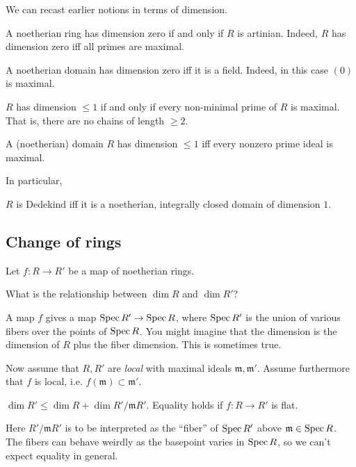 We can recast earlier notions in terms of dimension.
\begin{remark} 
A noetherian ring has dimension zero if and only if $R$ is artinian. Indeed,
$R$ has dimension zero iff all primes are maximal.
\end{remark} 


\begin{remark} 
A noetherian domain has dimension zero iff it is a field. Indeed, in this case
$(0)$ is maximal.
\end{remark} 

\begin{remark} 
$R$ has dimension $\leq 1$ if and only if every non-minimal prime of $R$ is
maximal. That is, there are no chains of length $\geq 2$.
\end{remark} 

\begin{remark} 
A (noetherian) domain  $R$ has dimension $\leq 1$ iff every nonzero prime ideal
is maximal.
\end{remark} 

In particular,
\begin{proposition} 
$R$ is Dedekind iff it is a noetherian, integrally closed domain of dimension
$1$. 
\end{proposition} 

\subsection{Change of rings}
Let $f: R \to R'$ be  a map of noetherian rings. 

\begin{question} 
What is the relationship between $\dim R$ and $\dim R'$?
\end{question} 

A map $f$ gives a map $\operatorname{Spec} R' \to \operatorname{Spec} R$, where $\operatorname{Spec} R'$ is the union
of various fibers over the points of $\operatorname{Spec} R$. You might imagine that the
dimension is the dimension of $R$ plus the fiber dimension. This is sometimes
true.

Now assume that $R, R'$ are \emph{local}  with maximal ideals $\mathfrak{m},
\mathfrak{m}'$. Assume furthermore that $f$ is local, i.e. $f(\mathfrak{m})
\subset \mathfrak{m}'$.

\begin{theorem} 
$\dim R' \leq \dim R +  \dim R'/\mathfrak{m}R'$. Equality holds if $f: R \to
R'$ is flat.
\end{theorem} 

Here $R'/\mathfrak{m}R'$ is to be interpreted as the ``fiber'' of $\operatorname{Spec} R'$
above $\mathfrak{m} \in \operatorname{Spec} R$. The fibers can behave weirdly as the
basepoint varies in $\operatorname{Spec} R$, so we can't
expect equality in general.


